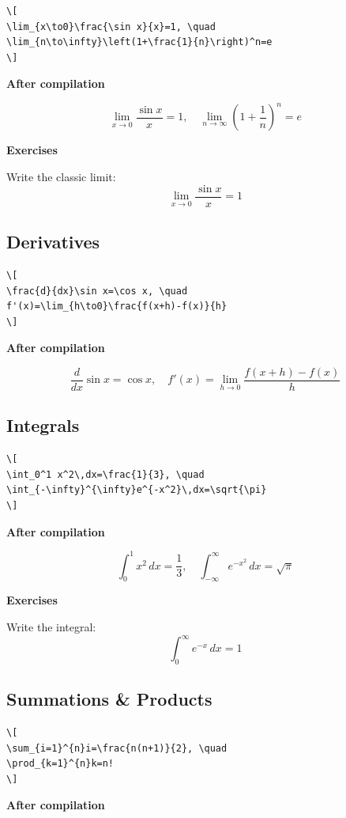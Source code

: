 \documentclass[12pt,a4paper]{article}
\begin{document}
\begin{verbatim}
\[
\lim_{x\to0}\frac{\sin x}{x}=1, \quad
\lim_{n\to\infty}\left(1+\frac{1}{n}\right)^n=e
\]
\end{verbatim}

\textbf{After compilation}

\[
\lim_{x\to0}\frac{\sin x}{x}=1, \quad
\lim_{n\to\infty}\left(1+\frac{1}{n}\right)^n=e
\]

\textbf{\color[HTML]{CA6F1E}Exercises}

Write the classic limit:
\[
\lim_{x\to0}\frac{\sin x}{x}=1
\]

\subsection{Derivatives}

\begin{verbatim}
\[
\frac{d}{dx}\sin x=\cos x, \quad
f'(x)=\lim_{h\to0}\frac{f(x+h)-f(x)}{h}
\]    
\end{verbatim}

\textbf{After compilation}

\[
\frac{d}{dx}\sin x=\cos x, \quad
f'(x)=\lim_{h\to0}\frac{f(x+h)-f(x)}{h}
\]

\subsection{Integrals}

\begin{verbatim}
\[
\int_0^1 x^2\,dx=\frac{1}{3}, \quad
\int_{-\infty}^{\infty}e^{-x^2}\,dx=\sqrt{\pi}
\]
\end{verbatim}

\textbf{After compilation}

\[
\int_0^1 x^2\,dx=\frac{1}{3}, \quad
\int_{-\infty}^{\infty}e^{-x^2}\,dx=\sqrt{\pi}
\]

\textbf{\color[HTML]{CA6F1E}Exercises}

Write the integral:
\[
\int_0^\infty e^{-x}\,dx=1
\]

\subsection{Summations \& Products}

\begin{verbatim}
\[
\sum_{i=1}^{n}i=\frac{n(n+1)}{2}, \quad
\prod_{k=1}^{n}k=n!
\]
\end{verbatim}

\textbf{After compilation}
\end{document}
